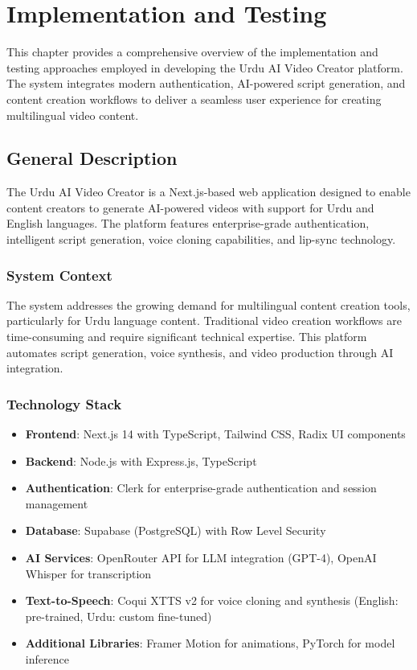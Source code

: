 \chapter{Implementation and Testing}

This chapter provides a comprehensive overview of the implementation and testing approaches employed in developing the Urdu AI Video Creator platform. The system integrates modern authentication, AI-powered script generation, and content creation workflows to deliver a seamless user experience for creating multilingual video content.


\section{General Description}

The Urdu AI Video Creator is a Next.js-based web application designed to enable content creators to generate AI-powered videos with support for Urdu and English languages. The platform features enterprise-grade authentication, intelligent script generation, voice cloning capabilities, and lip-sync technology.

\subsection{System Context}

The system addresses the growing demand for multilingual content creation tools, particularly for Urdu language content. Traditional video creation workflows are time-consuming and require significant technical expertise. This platform automates script generation, voice synthesis, and video production through AI integration.

\subsection{Technology Stack}

\begin{itemize}
    \item \textbf{Frontend}: Next.js 14 with TypeScript, Tailwind CSS, Radix UI components
    \item \textbf{Backend}: Node.js with Express.js, TypeScript
    \item \textbf{Authentication}: Clerk for enterprise-grade authentication and session management
    \item \textbf{Database}: Supabase (PostgreSQL) with Row Level Security
    \item \textbf{AI Services}: OpenRouter API for LLM integration (GPT-4), OpenAI Whisper for transcription
    \item \textbf{Text-to-Speech}: Coqui XTTS v2 for voice cloning and synthesis (English: pre-trained, Urdu: custom fine-tuned)
    \item \textbf{Additional Libraries}: Framer Motion for animations, PyTorch for model inference
\end{itemize}

